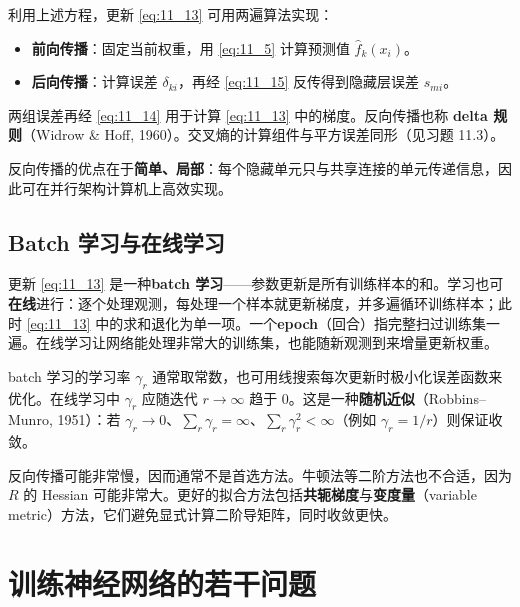 \begin{remark}[两遍算法]
利用上述方程，更新 \ref{eq:11_13} 可用两遍算法实现：
\begin{itemize}
\item \textbf{前向传播}：固定当前权重，用 \ref{eq:11_5} 计算预测值 $\hat{f}_k(x_i)$。
\item \textbf{后向传播}：计算误差 $\delta_{ki}$，再经 \ref{eq:11_15} 反传得到隐藏层误差 $s_{mi}$。
\end{itemize}
两组误差再经 \ref{eq:11_14} 用于计算 \ref{eq:11_13} 中的梯度。反向传播也称 \textbf{delta 规则}（Widrow \& Hoff, 1960）。交叉熵的计算组件与平方误差同形（见习题 11.3）。
\end{remark}

\begin{remark}[反向传播的优点]
反向传播的优点在于\textbf{简单、局部}：每个隐藏单元只与共享连接的单元传递信息，因此可在并行架构计算机上高效实现。
\end{remark}

\subsection{Batch 学习与在线学习}

更新 \ref{eq:11_13} 是一种\textbf{batch 学习}——参数更新是所有训练样本的和。学习也可\textbf{在线}进行：逐个处理观测，每处理一个样本就更新梯度，并多遍循环训练样本；此时 \ref{eq:11_13} 中的求和退化为单一项。一个\textbf{epoch}（回合）指完整扫过训练集一遍。在线学习让网络能处理非常大的训练集，也能随新观测到来增量更新权重。

\begin{remark}
batch 学习的学习率 $\gamma_r$ 通常取常数，也可用线搜索每次更新时极小化误差函数来优化。在线学习中 $\gamma_r$ 应随迭代 $r\to\infty$ 趋于 0。这是一种\textbf{随机近似}（Robbins--Munro, 1951）：若 $\gamma_r\to 0$、$\sum_r \gamma_r = \infty$、$\sum_r \gamma_r^2 < \infty$（例如 $\gamma_r = 1/r$）则保证收敛。
\end{remark}

\begin{remark}[反向传播可能很慢]
反向传播可能非常慢，因而通常不是首选方法。牛顿法等二阶方法也不合适，因为 $R$ 的 Hessian 可能非常大。更好的拟合方法包括\textbf{共轭梯度}与\textbf{变度量}（variable metric）方法，它们避免显式计算二阶导矩阵，同时收敛更快。
\end{remark}

\section{训练神经网络的若干问题}

